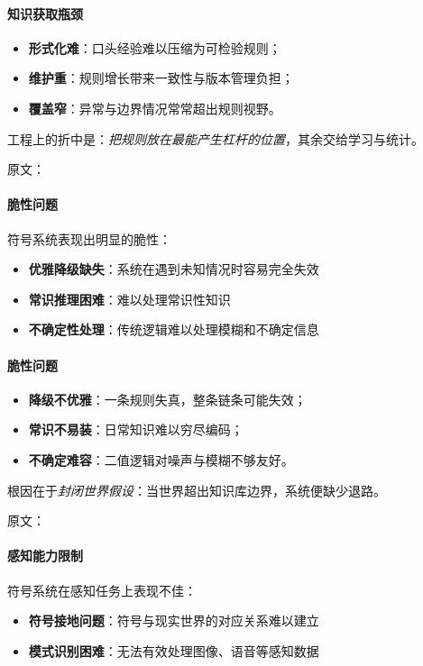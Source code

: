 \paragraph{知识获取瓶颈}
\begin{itemize}
\item \textbf{形式化难}：口头经验难以压缩为可检验规则；
\item \textbf{维护重}：规则增长带来一致性与版本管理负担；
\item \textbf{覆盖窄}：异常与边界情况常常超出规则视野。
\end{itemize}
工程上的折中是：\emph{把规则放在最能产生杠杆的位置}，其余交给学习与统计。

原文：
\paragraph{脆性问题}
符号系统表现出明显的脆性：
\begin{itemize}
\item \textbf{优雅降级缺失}：系统在遇到未知情况时容易完全失效
\item \textbf{常识推理困难}：难以处理常识性知识
\item \textbf{不确定性处理}：传统逻辑难以处理模糊和不确定信息
\end{itemize}
\paragraph{脆性问题}
\begin{itemize}
\item \textbf{降级不优雅}：一条规则失真，整条链条可能失效；
\item \textbf{常识不易装}：日常知识难以穷尽编码；
\item \textbf{不确定难容}：二值逻辑对噪声与模糊不够友好。
\end{itemize}
根因在于\emph{封闭世界假设}：当世界超出知识库边界，系统便缺少退路。

原文：
\paragraph{感知能力限制}
符号系统在感知任务上表现不佳：
\begin{itemize}
\item \textbf{符号接地问题}：符号与现实世界的对应关系难以建立
\item \textbf{模式识别困难}：无法有效处理图像、语音等感知数据
\end{itemize}
